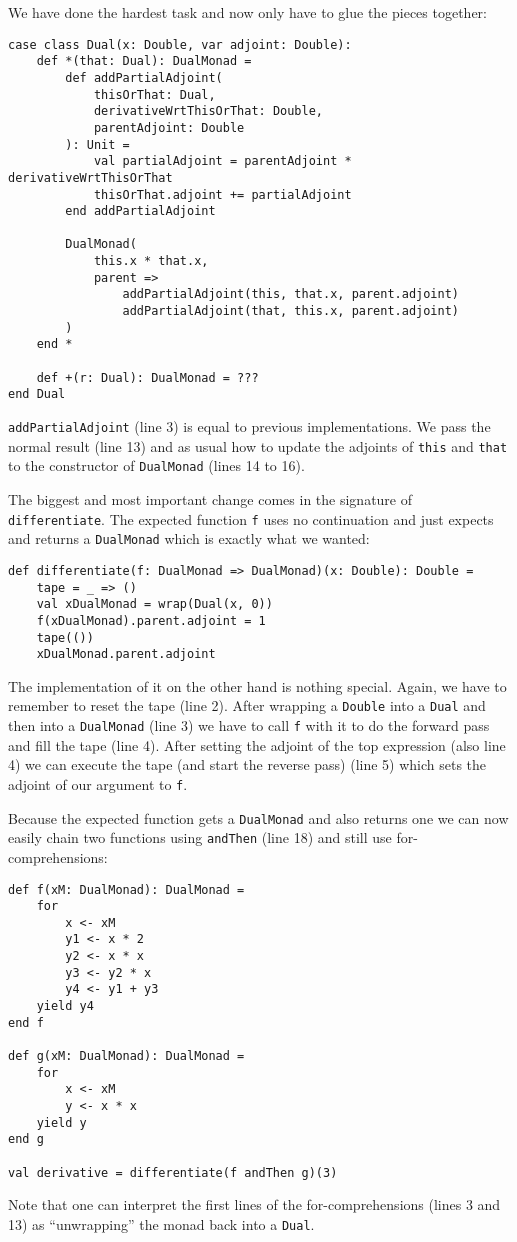 We have done the hardest task and now only have to glue the pieces together:
\begin{lstlisting}
case class Dual(x: Double, var adjoint: Double):
    def *(that: Dual): DualMonad =
        def addPartialAdjoint(
            thisOrThat: Dual,
            derivativeWrtThisOrThat: Double,
            parentAdjoint: Double
        ): Unit =
            val partialAdjoint = parentAdjoint * derivativeWrtThisOrThat
            thisOrThat.adjoint += partialAdjoint
        end addPartialAdjoint

        DualMonad(
            this.x * that.x,
            parent =>
                addPartialAdjoint(this, that.x, parent.adjoint)
                addPartialAdjoint(that, this.x, parent.adjoint)
        )
    end *

    def +(r: Dual): DualMonad = ???
end Dual
\end{lstlisting}
\lstinline{addPartialAdjoint} (line 3) is equal to previous implementations. We pass the normal result (line 13) and as usual how to update the adjoints of \lstinline{this} and \lstinline{that} to the constructor of \lstinline{DualMonad} (lines 14 to 16).

The biggest and most important change comes in the signature of \lstinline{differentiate}. The expected function \lstinline{f} uses no continuation and just expects and returns a \lstinline{DualMonad} which is exactly what we wanted:
\begin{lstlisting}
def differentiate(f: DualMonad => DualMonad)(x: Double): Double =
    tape = _ => ()
    val xDualMonad = wrap(Dual(x, 0))
    f(xDualMonad).parent.adjoint = 1
    tape(())
    xDualMonad.parent.adjoint
\end{lstlisting}
The implementation of it on the other hand is nothing special. Again, we have to remember to reset the tape (line 2). After wrapping a \lstinline{Double} into a \lstinline{Dual} and then into a \lstinline{DualMonad} (line 3) we have to call \lstinline{f} with it to do the forward pass and fill the tape (line 4). After setting the adjoint of the top expression (also line 4) we can execute the tape (and start the reverse pass) (line 5) which sets the adjoint of our argument to \lstinline{f}.

Because the expected function gets a \lstinline{DualMonad} and also returns one we can now easily chain two functions using \lstinline{andThen} (line 18) and still use for-comprehensions:
\begin{lstlisting}
def f(xM: DualMonad): DualMonad =
    for
        x <- xM
        y1 <- x * 2
        y2 <- x * x
        y3 <- y2 * x
        y4 <- y1 + y3
    yield y4
end f

def g(xM: DualMonad): DualMonad =
    for
        x <- xM
        y <- x * x
    yield y
end g

val derivative = differentiate(f andThen g)(3)
\end{lstlisting}
Note that one can interpret the first lines of the for-comprehensions (lines 3 and 13) as ``unwrapping'' the monad back into a \lstinline{Dual}.